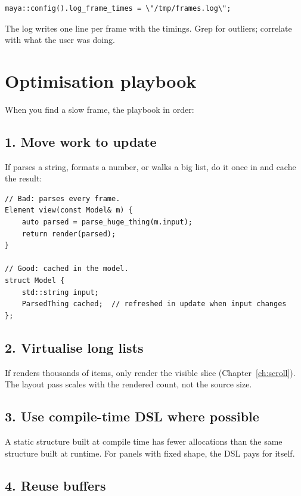 \begin{lstlisting}
maya::config().log_frame_times = \"/tmp/frames.log\";
\end{lstlisting}

The log writes one line per frame with the timings. Grep for
outliers; correlate with what the user was doing.

\section{Optimisation playbook}

When you find a slow frame, the playbook in order:

\subsection*{1. Move work to update}

If  parses a string, formats a number, or walks a
big list, do it once in  and cache the result:

\begin{lstlisting}
// Bad: parses every frame.
Element view(const Model& m) {
    auto parsed = parse_huge_thing(m.input);
    return render(parsed);
}

// Good: cached in the model.
struct Model {
    std::string input;
    ParsedThing cached;  // refreshed in update when input changes
};
\end{lstlisting}

\subsection*{2. Virtualise long lists}

If  renders thousands of items, only render the
visible slice (Chapter~\ref{ch:scroll}). The layout pass scales
with the rendered count, not the source size.

\subsection*{3. Use compile-time DSL where possible}

A static structure built at compile time has fewer allocations
than the same structure built at runtime. For panels with fixed
shape, the DSL pays for itself.

\subsection*{4. Reuse buffers}

